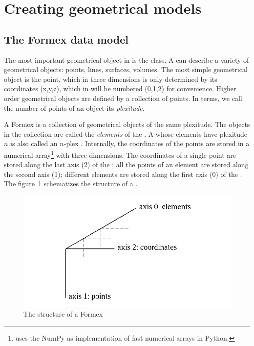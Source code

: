 \section{Creating geometrical models}
\label{sec:geom}

\subsection{The Formex data model}

The most important geometrical object in \pyf is the  class. A  can describe a variety of geometrical objects: points, lines, surfaces, volumes. The most simple geometrical object is the point, which in three dimensions is only determined by its coordinates \code(x,y,z), which in \pyf will be numbered \code(0,1,2) for convenience. Higher order geometrical objects are defined by a collection of points. In \pyf terms, we call the number of points of an object its \emph{plexitude}. 

A Formex is a collection of geometrical objects of the same plexitude. The objects in the collection are called the \emph{elements} of the . A  whose elements have plexitude $n$ is also called an $n$-plex . Internally, the coordinates of the points are stored in a numerical array\footnote{\pyf uses the NumPy  as implementation of fast numerical arrays in Python.} with three dimensions. The coordinates of a single point are stored along the last axis (2) of the ; all the points of an element are stored along the second axis (1); different elements are stored along the first axis (0) of the . The figure~\ref{fig:formex} schematizes the structure of a . 

\begin{figure}[ht]
  \centering
  \begin{makeimage}
  \end{makeimage}
  \begin{latexonly}
    \includegraphics{images/Formex}
  \end{latexonly}
  \begin{htmlonly}
  \end{htmlonly}  
  \caption{The structure of a Formex}
  \label{fig:formex}
\end{figure}

